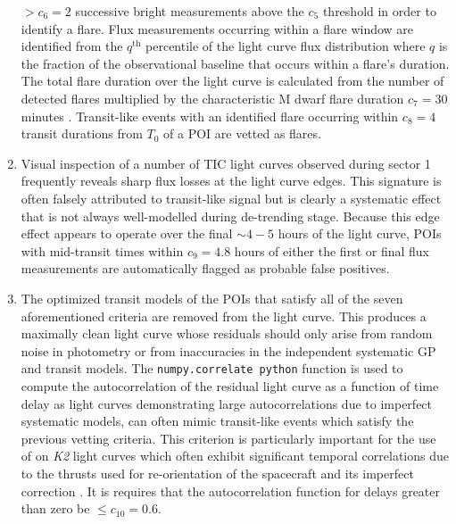 \begin{enumerate}
  $>c_6=2$ successive bright measurements above the $c_5$ threshold in order to identify a flare.
  Flux measurements occurring within a flare window are identified from the $q^{\text{th}}$ percentile
  of the light curve flux distribution where $q$ is the fraction of the observational baseline
  that occurs within a flare's duration. The total flare duration over the light curve is calculated from the
  number of detected flares multiplied by the characteristic M dwarf flare duration $c_7=30$ minutes
  \citep{moffett74,walkowicz11,hawley14}. Transit-like
  events with an identified flare occurring within $c_8=4$ transit durations from $T_0$ of a POI are vetted as
  flares.
\item Visual inspection of a number of TIC light curves observed during sector 1 frequently reveals sharp
  flux losses at the light curve edges. This signature is often falsely attributed to transit-like
  signal but is clearly a systematic effect that is not always well-modelled during de-trending stage.
  Because this edge effect appears to operate over the final $\sim 4-5$ hours of the light curve,
  POIs with mid-transit times within $c_9=4.8$ hours of either the first or final flux measurements
  are automatically flagged as probable false positives.
\item The optimized transit models of the POIs that satisfy all of the seven aforementioned criteria are
  removed from the light curve. This produces a maximally clean light curve whose residuals should only
  arise from random noise in photometry or from inaccuracies in the independent systematic GP and transit
  models. The \texttt{numpy.correlate python} function is used to compute the autocorrelation of the
  residual light curve as a function of time delay as light curves demonstrating large autocorrelations
  due to imperfect systematic models, can often mimic transit-like events which satisfy
  the previous vetting criteria. This criterion is particularly important for the use of \pipeline{} on
  \emph{K2} light curves which often exhibit significant temporal correlations due to the thrusts used for
  re-orientation of the spacecraft and its imperfect correction \citep{vanderburg14}. It is requires that
  the autocorrelation function for delays greater than zero be $\leq c_{10}=0.6$.
\end{enumerate}


